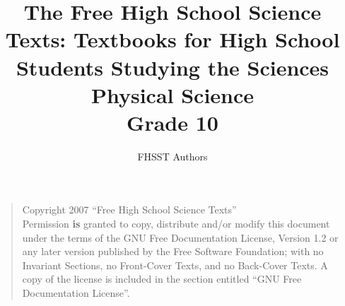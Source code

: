 \documentclass[10pt,a4paper,titlepage,twoside,openright]{report}
\begin{document}
\title{The Free High School Science Texts: Textbooks for High School Students Studying the Sciences\\
\textbf{Physical Science}\\
Grade 10}
\author{FHSST Authors}
\maketitle
\begin{quote}
Copyright 2007 ``Free High School Science Texts''\\
Permission \textbf{is} granted to copy, distribute and/or modify this document under the terms of the GNU Free Documentation License, Version 1.2 or any later version published by the Free Software Foundation; with no Invariant Sections, no Front-Cover Texts, and no Back-Cover Texts.
A copy of the license is included in the section entitled ``GNU Free Documentation License''.
\end{quote}
\end{document}
